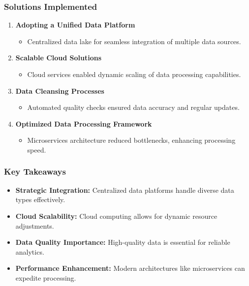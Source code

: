 \documentclass[aspectratio=169]{beamer}
\begin{document}
\begin{frame}[fragile]
    \frametitle{Solutions Implemented}
    \begin{enumerate}
        \item \textbf{Adopting a Unified Data Platform}
          \begin{itemize}
              \item Centralized data lake for seamless integration of multiple data sources.
          \end{itemize}
          
        \item \textbf{Scalable Cloud Solutions}
          \begin{itemize}
              \item Cloud services enabled dynamic scaling of data processing capabilities.
          \end{itemize}
          
        \item \textbf{Data Cleansing Processes}
          \begin{itemize}
              \item Automated quality checks ensured data accuracy and regular updates.
          \end{itemize}
          
        \item \textbf{Optimized Data Processing Framework}
          \begin{itemize}
              \item Microservices architecture reduced bottlenecks, enhancing processing speed.
          \end{itemize}
    \end{enumerate}
\end{frame}

\begin{frame}[fragile]
    \frametitle{Key Takeaways}
    \begin{itemize}
        \item \textbf{Strategic Integration:} Centralized data platforms handle diverse data types effectively.
        \item \textbf{Cloud Scalability:} Cloud computing allows for dynamic resource adjustments.
        \item \textbf{Data Quality Importance:} High-quality data is essential for reliable analytics.
        \item \textbf{Performance Enhancement:} Modern architectures like microservices can expedite processing.
    \end{itemize}
\end{frame}
\end{document}
